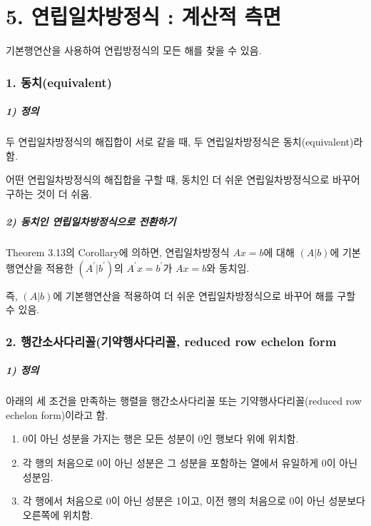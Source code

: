 \part*{5. 연립일차방정식 : 계산적 측면}

기본행연산을 사용하여 연립방정식의 모든 해를 찾을 수 있음.

\section*{1. 동치(equivalent)}
\subsubsection*{1) 정의\\}
\begin{DEF}
두 연립일차방정식의 해집합이 서로 같을 때, 두 연립일차방정식은 동치(equivalent)라 함.
\end{DEF}

어떤 연립일차방정식의 해집합을 구할 때, 동치인 더 쉬운 연립일차방정식으로 바꾸어 구하는 것이 더 쉬움.

\subsubsection*{2) 동치인 연립일차방정식으로 전환하기}
Theorem 3.13의 Corollary에 의하면, 연립일차방정식 $Ax=b$에 대해 $(A|b)$에 기본행연산을 적용한 $(A^{\prime}|b^{\prime})$의 $A^{\prime}x=b^{\prime}$가 $Ax=b$와 동치임.

즉, $(A|b)$에 기본행연산을 적용하여 더 쉬운 연립일차방정식으로 바꾸어 해를 구할 수 있음.

\section*{2. 행간소사다리꼴(기약행사다리꼴, reduced row echelon form}
\subsubsection*{1) 정의\\}
\begin{DEF}
아래의 세 조건을 만족하는 행렬을 행간소사다리꼴 또는 기약행사다리꼴(reduced row echelon form)이라고 함.

\begin{enumerate}
    \item 0이 아닌 성분을 가지는 행은 모든 성분이 0인 행보다 위에 위치함.
    \item 각 행의 처음으로 0이 아닌 성분은 그 성분을 포함하는 열에서 유일하게 0이 아닌 성분임.
    \item 각 행에서 처음으로 0이 아닌 성분은 1이고, 이전 행의 처음으로 0이 아닌 성분보다 오른쪽에 위치함.
\end{enumerate}
\end{DEF}

